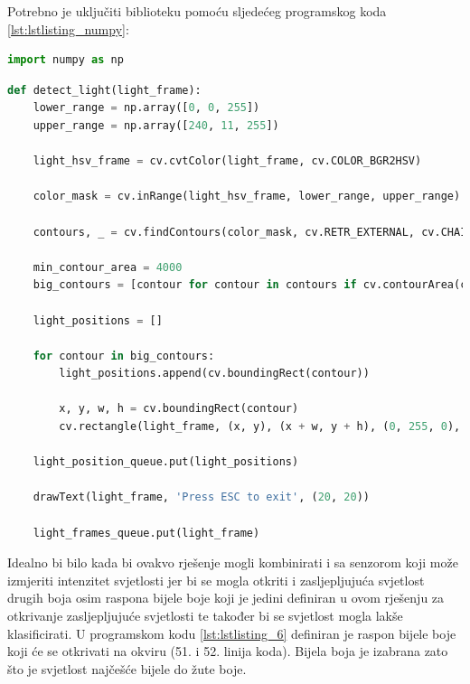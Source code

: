 \documentclass{foi}
\begin{document}
\flushleft Potrebno je uključiti biblioteku pomoću sljedećeg programskog koda \ref{lst:lstlisting_numpy}:
\begin{lstlisting}[language=Python, label={lst:lstlisting_numpy}, firstnumber=3, style=colored, caption=Uključivanje biblioteke $numpy$]
import numpy as np
\end{lstlisting}

\begin{lstlisting}[language=Python, label={lst:lstlisting_6}, firstnumber=50, style=colored, caption={Definicija funkcije $detect\_light()$}]
def detect_light(light_frame):
    lower_range = np.array([0, 0, 255])
    upper_range = np.array([240, 11, 255])

    light_hsv_frame = cv.cvtColor(light_frame, cv.COLOR_BGR2HSV)

    color_mask = cv.inRange(light_hsv_frame, lower_range, upper_range)

    contours, _ = cv.findContours(color_mask, cv.RETR_EXTERNAL, cv.CHAIN_APPROX_SIMPLE)

    min_contour_area = 4000
    big_contours = [contour for contour in contours if cv.contourArea(contour) > min_contour_area]

    light_positions = []

    for contour in big_contours:
        light_positions.append(cv.boundingRect(contour))

        x, y, w, h = cv.boundingRect(contour)
        cv.rectangle(light_frame, (x, y), (x + w, y + h), (0, 255, 0), 2)

    light_position_queue.put(light_positions)

    drawText(light_frame, 'Press ESC to exit', (20, 20))

    light_frames_queue.put(light_frame)
\end{lstlisting}

\justifying

Idealno bi bilo kada bi ovakvo rješenje mogli kombinirati i sa senzorom koji može izmjeriti intenzitet svjetlosti jer bi se mogla otkriti i zasljepljujuća svjetlost drugih boja osim raspona bijele boje koji je jedini definiran u ovom rješenju za otkrivanje zasljepljujuće svjetlosti te također bi se svjetlost mogla lakše klasificirati. U programskom kodu \ref{lst:lstlisting_6} definiran je raspon bijele boje koji će se otkrivati na okviru (51. i 52. linija koda). Bijela boja je izabrana zato što je svjetlost najčešće bijele do žute boje.
\end{document}
